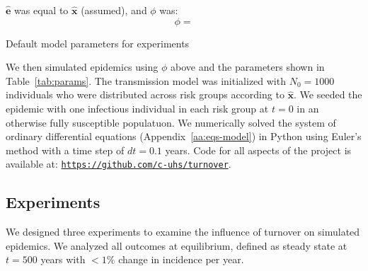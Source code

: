 $\bm{\hat{e}}$ was equal to $\bm{\hat{x}}$ (assumed), and $\phi$ was:
\begin{equation}
\label{eq:phi-values}
\phi = 
\end{equation}
\begin{table}
  \centering
  \caption{Default model parameters for experiments}
  \label{tab:params}
  
\end{table}
We then simulated epidemics using $\phi$ above
and the parameters shown in Table~\ref{tab:params}.
The transmission model was initialized with $N_0 = 1000$ individuals
who were distributed across risk groups according to $\bm{\hat{x}}$.
We seeded the epidemic with
one infectious individual in each risk group at $t = 0$ in an otherwise 
fully susceptible populatuon.
We numerically solved the system of ordinary differential equations
(Appendix~\ref{aa:eqs-model}) in Python
using Euler's method with a time step of $dt = 0.1$ years.
Code for all aspects of the project is available at:
\href{https://github.com/c-uhs/turnover}{\small\texttt{https://github.com/c-uhs/turnover}}.
\subsection{Experiments}
\label{ss:exp}
We designed three experiments to examine the influence of turnover on simulated epidemics.
We analyzed all outcomes at equilibrium,
defined as steady state at $t = 500$ years
with $<1\%$ change in incidence per year.

